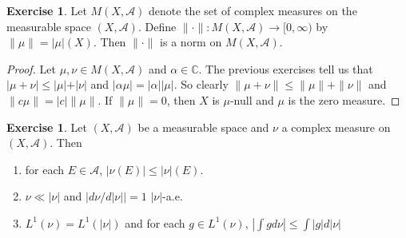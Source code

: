 \documentclass[12pt]{amsart}
\theoremstyle{definition}
\newtheorem{ex}[definition]{Exercise}
\newcommand{\al}{\alpha}
\newcommand{\C}{\mathbb{C}}
\newcommand{\MA}{\mathcal{A}}
\newcommand{\Rg}{[0,\infty)}
\begin{document}
	\begin{ex}
		Let $M(X, \MA)$ denote the set of complex measures on the measurable space $(X, \MA)$. Define $\|\cdot \|: M(X, \MA) \rightarrow \Rg$ by $\|\mu \|= \vert \mu \vert (X)$. Then $\|\cdot \|$ is a norm on $M(X, \MA)$. 
	\end{ex}
	
	\begin{proof}
		Let $\mu, \nu \in M(X, \MA)$ and $\al \in \C$. The previous exercises tell us that $\vert \mu + \nu \vert \leq \vert \mu \vert + \vert \nu \vert$ and $\vert \al \mu \vert = \vert \al \vert \vert \mu \vert$. So clearly $\|\mu + \nu \|\leq \|\mu \|+ \|\nu \|$ and $\|c \mu \|= \vert c \vert \|\mu \|$. If $\|\mu \|= 0$, then $X$ is $\mu$-null and $\mu$ is the zero measure.
	\end{proof}
	
	\begin{ex}
		Let $(X, \MA)$ be a measurable space and $\nu$ a complex measure on $(X, \MA)$. Then 
		
		\begin{enumerate}
			\item for each $E \in \MA$, $|\nu(E)| \leq |\nu|(E)$. 
			\item $\nu \ll |\nu|$ and $\big|d \nu /d |\nu|\big| = 1$ $|\nu|$-a.e.
			\item $L^1(\nu) = L^1(|\nu|)$ and for each $g \in L^1(\nu)$, $|\int g d\nu| \leq \int |g|d |\nu|$
		\end{enumerate}
	\end{ex}
	
\end{document}

